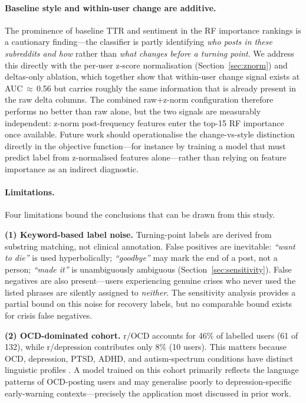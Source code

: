 \documentclass[11pt]{article}
\begin{document}
\paragraph{Baseline style and within-user change are additive.}
The prominence of baseline TTR and sentiment in the RF importance
rankings is a cautionary finding---the classifier is partly identifying
\emph{who posts in these subreddits and how} rather than \emph{what
changes before a turning point}.
We address this directly with the per-user z-score normalisation
(Section~\ref{sec:znorm}) and deltas-only ablation, which together
show that within-user change signal exists at AUC\,$\approx$\,0.56 but
carries roughly the same information that is already present in the
raw delta columns.
The combined raw+z-norm configuration therefore performs no better
than raw alone, but the two signals are measurably independent: z-norm
post-frequency features enter the top-15 RF importance once available.
Future work should operationalise the change-vs-style distinction
directly in the objective function---for instance by training a model
that must predict label from z-normalised features alone---rather
than relying on feature importance as an indirect diagnostic.

\paragraph{Limitations.}
Four limitations bound the conclusions that can be drawn from this study.

\textbf{(1) Keyword-based label noise.}
Turning-point labels are derived from substring matching, not clinical
annotation.
False positives are inevitable: \emph{``want to die''} is used
hyperbolically; \emph{``goodbye''} may mark the end of a post, not a
person; \emph{``made it''} is unambiguously ambiguous (Section~\ref{sec:sensitivity}).
False negatives are also present---users experiencing genuine crises who
never used the listed phrases are silently assigned to \emph{neither}.
The sensitivity analysis provides a partial bound on this noise for
recovery labels, but no comparable bound exists for crisis false negatives.

\textbf{(2) OCD-dominated cohort.}
r/OCD accounts for 46\% of labelled users (61 of 132), while r/depression
contributes only 8\% (10 users).
This matters because OCD, depression, PTSD, ADHD, and autism-spectrum
conditions have distinct linguistic profiles \citep{coppersmith2014quantifying,gkotsis2016language}.
A model trained on this cohort primarily reflects the language patterns of
OCD-posting users and may generalise poorly to depression-specific
early-warning contexts---precisely the application most discussed in
prior work.
\end{document}
